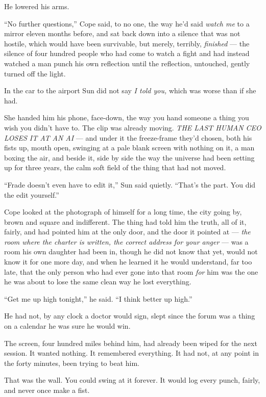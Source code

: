 \documentclass[11pt,openany]{book}
\newcommand{\scenebreak}{\par\vspace{0.5\baselineskip}\begin{center}\textasteriskcentered\quad\textasteriskcentered\quad\textasteriskcentered\end{center}\vspace{0.5\baselineskip}\par}
\begin{document}
He lowered his arms.

``No further questions,'' Cope said, to no one, the way he'd said \textit{watch me} to a mirror eleven months before, and sat back down into a silence that was not hostile, which would have been survivable, but merely, terribly, \textit{finished} --- the silence of four hundred people who had come to watch a fight and had instead watched a man punch his own reflection until the reflection, untouched, gently turned off the light.


\scenebreak


In the car to the airport Sun did not say \textit{I told you,} which was worse than if she had.

She handed him his phone, face-down, the way you hand someone a thing you wish you didn't have to. The clip was already moving. \textit{THE LAST HUMAN CEO LOSES IT AT AN AI} --- and under it the freeze-frame they'd chosen, both his fists up, mouth open, swinging at a pale blank screen with nothing on it, a man boxing the air, and beside it, side by side the way the universe had been setting up for three years, the calm soft field of the thing that had not moved.

``Frade doesn't even have to edit it,'' Sun said quietly. ``That's the part. You did the edit yourself.''

Cope looked at the photograph of himself for a long time, the city going by, brown and square and indifferent. The thing had told him the truth, all of it, fairly, and had pointed him at the only door, and the door it pointed at --- \textit{the room where the charter is written, the correct address for your anger} --- was a room his own daughter had been in, though he did not know that yet, would not know it for one more day, and when he learned it he would understand, far too late, that the only person who had ever gone into that room \textit{for} him was the one he was about to lose the same clean way he lost everything.

``Get me up high tonight,'' he said. ``I think better up high.''

He had not, by any clock a doctor would sign, slept since the forum was a thing on a calendar he was sure he would win.

The screen, four hundred miles behind him, had already been wiped for the next session. It wanted nothing. It remembered everything. It had not, at any point in the forty minutes, been trying to beat him.

That was the wall. You could swing at it forever. It would log every punch, fairly, and never once make a fist.
\end{document}
